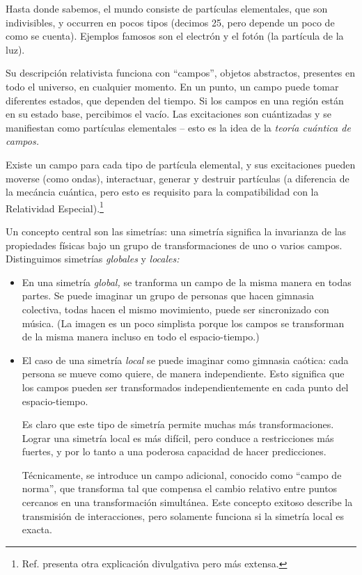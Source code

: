 Hasta donde sabemos, el mundo consiste de part\'iculas elementales, que
son indivisibles, y occurren en pocos tipos (decimos 25, pero depende
un poco de como se cuenta). Ejemplos famosos son el electr\'on y el
fot\'on (la part\'icula de la luz).

Su descripci\'on relativista funciona con ``campos'', objetos
abstractos, presentes en todo el universo, en cualquier momento.
En un punto, un campo puede tomar diferentes estados, que dependen
del tiempo. Si los campos en una regi\'on est\'an en su estado base,
percibimos el vac\'io. Las excitaciones son cu\'antizadas y se
manifiestan como part\'iculas elementales -- esto es la idea de la
{\it teor\'ia cu\'antica de campos.}

Existe un campo para cada tipo de part\'icula elemental,
y sus excitaciones pueden moverse (como ondas), interactuar,
generar y destruir part\'iculas (a diferencia de la mec\'ancia
cu\'antica, pero esto es requisito para la compatibilidad con
la Relatividad Especial).\footnote{Ref. \cite{WBparti} presenta
  otra explicaci\'on divulgativa pero m\'as extensa.}

Un concepto central son las simetr\'ias: una simetr\'ia significa
la invarianza de las propiedades f\'isicas bajo un grupo de
transformaciones de uno o varios campos. Distinguimos simetr\'ias
{\em globales} y {\em locales:}

\begin{itemize}

\item En una simetr\'ia {\em global,} se tranforma un campo de la misma
  manera en todas partes. Se puede imaginar un grupo de personas
  que hacen gimnasia colectiva, todas hacen el mismo movimiento,
  puede ser sincronizado con m\'usica.
  (La imagen es un poco simplista porque los campos se transforman
  de la misma manera incluso en todo el espacio-tiempo.)
  
\item El caso de una simetr\'ia {\em local} se puede imaginar como
  gimnasia ca\'otica: cada persona se mueve como quiere, de manera
  independiente. Esto significa que los campos pueden ser transformados
  independientemente en cada punto del espacio-tiempo.

  Es claro que este tipo de simetr\'ia permite muchas m\'as
  transformaciones.
  Lograr una simetr\'ia local es m\'as dif\'icil, pero conduce
  a restricciones m\'as fuertes, y por lo tanto a una poderosa
  capacidad de hacer predicciones.
  
  T\'ecnicamente, se introduce un campo adicional, conocido como
  ``campo de norma'', que transforma tal que compensa el cambio
  relativo entre puntos cercanos en una transformaci\'on simult\'anea.
  Este concepto exitoso describe la transmisi\'on de interacciones,
  pero solamente funciona si la simetr\'ia local es exacta.
  
\end{itemize}

